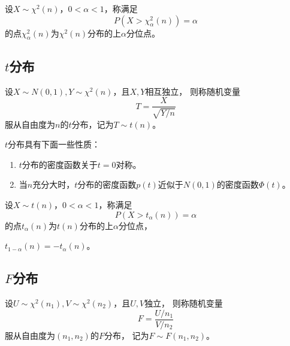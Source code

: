 \begin{definition}
  设$X\sim\chi^2(n)$，$0<\alpha<1$，称满足
  \begin{displaymath}
  P(X>\chi_\alpha^2(n)) = \alpha
  \end{displaymath}
  的点$\chi_\alpha^2(n)$为$\chi^2(n)$分布的上$\alpha$分位点。
\end{definition}

\subsection{$t$分布}
\begin{definition}[$t$分布]
  设$X\sim N(0,1),Y\sim \chi^2(n)$，且$X,Y$相互独立，
  则称随机变量
  \begin{displaymath}
    T=\frac{X}{\sqrt{Y/n}}
  \end{displaymath}
  服从自由度为$n$的$t$分布，记为$T\sim t(n)$。
\end{definition}

\begin{theorem}[$t$分布的性质]
  $t$分布具有下面一些性质：
  \begin{enumerate}
    \item
    $t$分布的密度函数关于$t=0$对称。
    \item
    当$n$充分大时，$t$分布的密度函数$p(t)$近似于$N(0,1)$的密度函数$\Phi(t)$。
  \end{enumerate}
\end{theorem}

\begin{definition}
  设$X\sim t(n)$，$0<\alpha<1$，称满足
  \begin{displaymath}
    P(X>t_\alpha(n)) = \alpha
  \end{displaymath}
  的点$t_\alpha(n)$为$t(n)$分布的上$\alpha$分位点，
\end{definition}

\begin{theorem}
  $t_{1-\alpha}(n) = -t_\alpha(n)$。
\end{theorem}

\subsection{$F$分布}
\begin{definition}[$F$分布]
  设$U\sim\chi^2(n_1), V\sim\chi^2(n_2)$，且$U,V$独立，
  则称随机变量
  \begin{displaymath}
    F = \frac{U/n_1}{V/n_2}
  \end{displaymath}
  服从自由度为$(n_1,n_2)$的$F$分布，
  记为$F\sim F(n_1,n_2)$。
\end{definition}

